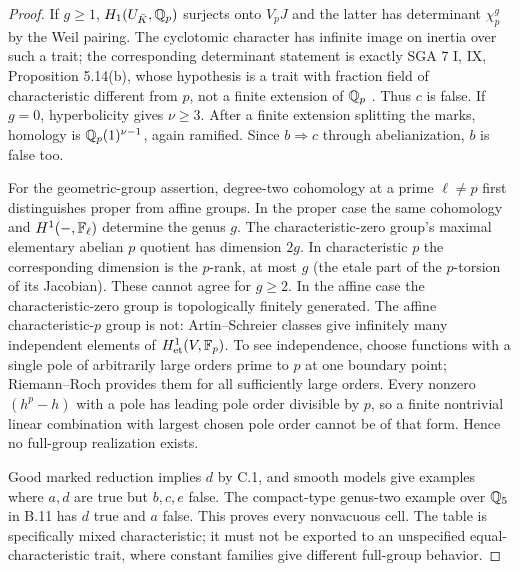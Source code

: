 \begin{proof}
If $g\ge1$, $H_1(U_{\bar K},\mathbb Q_p)$ surjects onto $V_pJ$ and the latter
has determinant $\chi_p^g$ by the Weil pairing. The cyclotomic character
has infinite image on inertia over such a trait; the corresponding
determinant statement is exactly SGA 7 I, IX, Proposition 5.14(b), whose
hypothesis is a trait with fraction field of characteristic different from
$p$, not a finite extension of $\mathbb Q_p$
\citep{BC_SGA7}. Thus $c$ is false. If $g=0$, hyperbolicity gives
$\nu\ge3$. After a finite extension splitting the marks, homology is
$\mathbb Q_p(1)^{\nu-1}$, again ramified. Since $b\Rightarrow c$ through
abelianization, $b$ is false too.

For the geometric-group assertion, degree-two cohomology at a prime
$\ell\ne p$ first distinguishes proper from affine groups. In the proper
case the same cohomology and $H^1(-,\mathbb F_\ell)$ determine the genus $g$.
The characteristic-zero group's maximal elementary abelian $p$ quotient
has dimension $2g$. In characteristic $p$ the corresponding dimension is
the $p$-rank, at most $g$ (the etale part of the $p$-torsion of its
Jacobian). These cannot agree for $g\ge2$. In the affine case the
characteristic-zero group is topologically finitely generated. The affine
characteristic-$p$ group is not: Artin--Schreier classes give infinitely many
independent elements of $H^1_{\rm et}(V,\mathbb F_p)$. To see independence, choose
functions with a single pole of arbitrarily large orders prime to $p$ at
one boundary point; Riemann--Roch provides them for all sufficiently large
orders. Every nonzero $(h^p-h)$ with a pole has leading pole order divisible
by $p$, so a finite nontrivial linear combination with largest chosen pole
order cannot be of that form. Hence no full-group realization exists.

Good marked reduction implies $d$ by C.1, and smooth models give examples
where $a,d$ are true but $b,c,e$ false. The compact-type genus-two example
over $\mathbb Q_5$ in B.11 has $d$ true and $a$ false. This proves every
nonvacuous cell. The table is specifically mixed characteristic;
it must not be exported to an unspecified equal-characteristic
trait, where constant families give different full-group behavior.
\end{proof}

